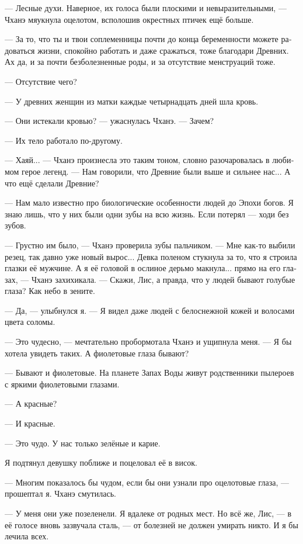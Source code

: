 \documentclass[a4paper,12pt,fleqn]{book}\usepackage{cooltooltips}\usepackage{polyglossia}\setdefaultlanguage[babelshorthands=true]{russian}\setotherlanguage{english}\defaultfontfeatures{Ligatures=TeX,Mapping=tex-text} \usepackage{xcolor}\definecolor{lightgray}{HTML}{bbbbbb}\color{lightgray}\newcommand{\ml}[3]{\textenglish{\textcolor{black}{#3}}}
\begin{document}
{--- Лесные духи.
Наверное, их голоса были плоскими и невыразительными, --- Чханэ мяукнула оцелотом, всполошив окрестных птичек ещё больше.

--- За то, что ты и твои соплеменницы почти до конца беременности можете радоваться жизни, спокойно работать и даже сражаться, тоже благодари Древних.
Ах да, и за почти безболезненные роды, и за отсутствие менструаций тоже.

--- Отсутствие чего?

--- У древних женщин из матки каждые четырнадцать дней шла кровь.

--- Они истекали кровью? --- ужаснулась Чханэ.
--- Зачем?

--- Их тело работало по-другому.

--- Хаяй... --- Чханэ произнесла это таким тоном, словно разочаровалась в любимом герое легенд.
--- Нам говорили, что Древние были выше и сильнее нас...
А что ещё сделали Древние?

--- Нам мало известно про биологические особенности людей до Эпохи богов.
Я знаю лишь, что у них были одни зубы на всю жизнь.
Если потерял --- ходи без зубов.

--- Грустно им было, --- Чханэ проверила зубы пальчиком.
--- Мне как-то выбили резец, так давно уже новый вырос...
Девка поленом стукнула за то, что я строила глазки её мужчине.
А я её головой в ослиное дерьмо макнула... прямо на его глазах, --- Чханэ захихикала.
--- Скажи, Лис, а правда, что у людей бывают голубые глаза?
Как небо в зените.

--- Да, --- улыбнулся я.
--- Я видел даже людей с белоснежной кожей и волосами цвета соломы.

--- Это чудесно, --- мечтательно пробормотала Чханэ и ущипнула меня.
--- Я бы хотела увидеть таких.
А фиолетовые глаза бывают?

--- Бывают и фиолетовые.
На планете Запах Воды живут родственники пылероев с яркими фиолетовыми глазами.

--- А красные?

--- И красные.

--- Это чудо.
У нас только зелёные и карие.

Я подтянул девушку поближе и поцеловал её в висок.

--- Многим показалось бы чудом, если бы они узнали про оцелотовые глаза, --- прошептал я.
Чханэ смутилась.

--- У меня они уже позеленели.
Я вдалеке от родных мест.
Но всё же, Лис, --- в её голосе вновь зазвучала сталь, --- от болезней не должен умирать никто.
И я бы лечила всех.

}
\end{document}
